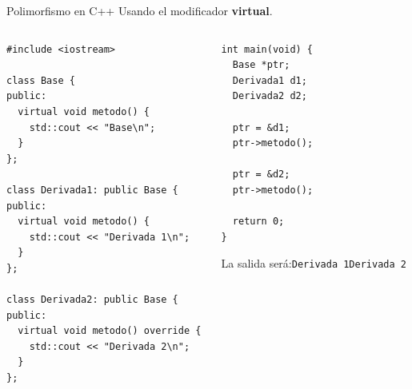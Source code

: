 \begin{frame}{Polimorfismo en C++}{
Usando el modificador \textbf{virtual}.
}
   \begin{columns}[t]
      \begin{column}{.6\linewidth}
         \begin{lstlisting}[style=normal,firstnumber=1]
#include <iostream>

class Base {
public:
  virtual void metodo() {
    std::cout << "Base\n";
  }
};

class Derivada1: public Base {
public:
  virtual void metodo() {
    std::cout << "Derivada 1\n";
  }
};

class Derivada2: public Base {
public:
  virtual void metodo() override {
    std::cout << "Derivada 2\n";
  }
};

         \end{lstlisting}
      \end{column}
      \begin{column}{.4\linewidth}
         \begin{lstlisting}[style=normal,firstnumber=25]
int main(void) {
  Base *ptr;
  Derivada1 d1;
  Derivada2 d2;

  ptr = &d1;
  ptr->metodo();

  ptr = &d2;
  ptr->metodo();

  return 0;
}
         \end{lstlisting}

      La salida ser\'a:\newline \texttt{Derivada 1\newline Derivada 2\newline}
      \end{column}
   \end{columns}
\end{frame}

